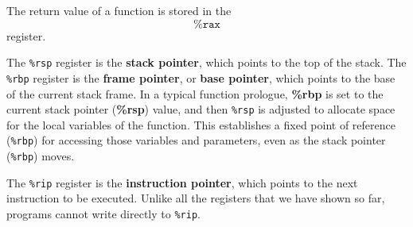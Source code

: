 \documentclass{article}
\begin{document}
  \begin{definition}
    The return value of a function is stored in the 
    \begin{equation}
      \texttt{\%rax} 
    \end{equation}
    register.
  \end{definition}

  \begin{definition}
    The \texttt{\%rsp} register is the \textbf{stack pointer}, which points to the top of the stack. The \texttt{\%rbp} register is the \textbf{frame pointer}, or \textbf{base pointer}, which points to the base of the current stack frame. In a typical function prologue, \textbf{\%rbp} is set to the current stack pointer (\textbf{\%rsp}) value, and then \texttt{\%rsp} is adjusted to allocate space for the local variables of the function. This establishes a fixed point of reference (\texttt{\%rbp}) for accessing those variables and parameters, even as the stack pointer (\texttt{\%rbp}) moves.
  \end{definition}

  \begin{definition}
    The \texttt{\%rip} register is the \textbf{instruction pointer}, which points to the next instruction to be executed. Unlike all the registers that we have shown so far, programs cannot write directly to \texttt{\%rip}. 
  \end{definition}
\end{document}
